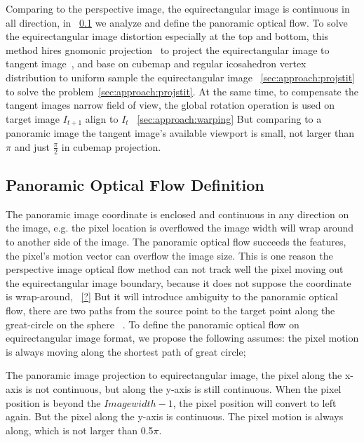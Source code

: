 % 
Comparing to the perspective image, the equirectangular image is continuous in all direction, in ~\cref{sec:approach:definition} we analyze and define the panoramic optical flow.
%
To solve the equirectangular image distortion especially at the top and bottom, this method hires gnomonic projection~\cite{?} to project the equirectangular image to tangent image~\cite{?}, and base on cubemap and regular icosahedron vertex distribution to uniform sample the equirectangular image ~\cref{sec:approach:projstit} to solve the problem~\cref{sec:approach:projstit}.
%
At the same time, to compensate the tangent images narrow field of view, the global rotation operation is used on target image $I_{t+1}$ align to $I_t$ ~\cref{sec:approach:warping}
But comparing to a panoramic image the tangent image's available viewport is small, not larger than $\pi$ and just $\frac{\pi}{2}$ in cubemap projection.

\subsection{Panoramic Optical Flow Definition}
\label{sec:approach:definition}

The panoramic image coordinate is enclosed and continuous in any direction on the image, e.g. the pixel location is overflowed the image width will wrap around to another side of the image.
The panoramic optical flow succeeds the features, the pixel's motion vector can overflow the image size.
This is one reason the perspective image optical flow method can not track well the pixel moving out the equirectangular image boundary, because it does not suppose the coordinate is wrap-around, ~\cref{?}
%
But it will introduce ambiguity to the panoramic optical flow, 
there are two paths from the source point to the target point along the great-circle on the sphere ~\cite{??}.
To define the panoramic optical flow on equirectangular image format, we propose the following assumes:
the pixel motion is always moving along the shortest path of great circle;

The panoramic image projection to equirectangular image, the pixel along the x-axis is not continuous, but along the y-axis is still continuous. When the pixel position is beyond the  ${Imagewidth -1}$, the pixel position will convert to left again.
But the pixel along the y-axis is continuous.
The pixel motion is always along, which is not larger than 0.5$\pi$.

